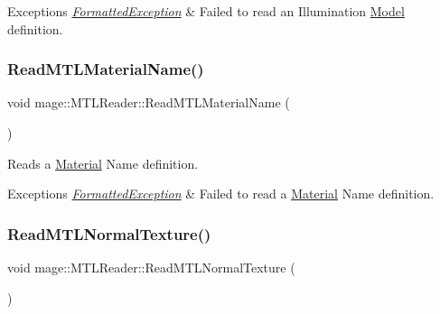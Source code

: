 \begin{DoxyExceptions}{Exceptions}
{\em \hyperlink{structmage_1_1_formatted_exception}{Formatted\+Exception}} & Failed to read an Illumination \hyperlink{classmage_1_1_model}{Model} definition. \\
\hline
\end{DoxyExceptions}
\hypertarget{classmage_1_1_m_t_l_reader_a53494ca5e0f905b97227b21711a1686a}{}\label{classmage_1_1_m_t_l_reader_a53494ca5e0f905b97227b21711a1686a} 
\subsubsection{\texorpdfstring{Read\+M\+T\+L\+Material\+Name()}{ReadMTLMaterialName()}}
{\footnotesize\ttfamily void mage\+::\+M\+T\+L\+Reader\+::\+Read\+M\+T\+L\+Material\+Name (\begin{DoxyParamCaption}{ }\end{DoxyParamCaption})\hspace{0.3cm}{\ttfamily [private]}}

Reads a \hyperlink{structmage_1_1_material}{Material} Name definition.


\begin{DoxyExceptions}{Exceptions}
{\em \hyperlink{structmage_1_1_formatted_exception}{Formatted\+Exception}} & Failed to read a \hyperlink{structmage_1_1_material}{Material} Name definition. \\
\hline
\end{DoxyExceptions}
\hypertarget{classmage_1_1_m_t_l_reader_ae44a5704a09edb722f99a480a58c807a}{}\label{classmage_1_1_m_t_l_reader_ae44a5704a09edb722f99a480a58c807a} 
\subsubsection{\texorpdfstring{Read\+M\+T\+L\+Normal\+Texture()}{ReadMTLNormalTexture()}}
{\footnotesize\ttfamily void mage\+::\+M\+T\+L\+Reader\+::\+Read\+M\+T\+L\+Normal\+Texture (\begin{DoxyParamCaption}{ }\end{DoxyParamCaption})\hspace{0.3cm}{\ttfamily [private]}}

